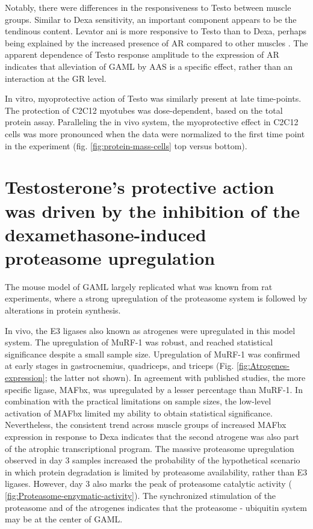 \documentclass[12pt,english]{report}\usepackage[]{graphicx}\usepackage[]{color}
\begin{document}
Notably, there were differences in the responsiveness to Testo between
muscle groups. Similar to Dexa sensitivity, an important component
appears to be the tendinous content. Levator ani is more responsive
to Testo than to Dexa, perhaps being explained by the increased presence
of AR compared to other muscles \citep{bentvelsen1996regulation}.
The apparent dependence of Testo response amplitude to the expression
of AR indicates that alleviation of GAML by AAS is a specific effect,
rather than an interaction at the GR level.

In vitro, myoprotective action of Testo was similarly present at late
time-points. The protection of C2C12 myotubes was dose-dependent,
based on the total protein assay. Paralleling the in vivo system,
the myoprotective effect in C2C12 cells was more pronounced when the
data were normalized to the first time point in the experiment (fig.
\ref{fig:protein-mass-cells} top versus bottom).


\section{Testosterone’s protective action was driven by the inhibition of
the dexamethasone-induced proteasome upregulation}

The mouse model of GAML largely replicated what was known from rat
experiments, where a strong upregulation of the proteasome system
is followed by alterations in protein synthesis.

In vivo, the E3 ligases also known as atrogenes were upregulated in
this model system. The upregulation of MuRF-1 was robust, and reached
statistical significance despite a small sample size. Upregulation
of MuRF-1 was confirmed at early stages in gastrocnemius, quadriceps,
and triceps (Fig. \ref{fig:Atrogenes-expression}; the latter not
shown). In agreement with published studies, the more specific ligase,
MAFbx, was upregulated by a lesser percentage than MuRF-1. In combination
with the practical limitations on sample sizes, the low-level activation
of MAFbx limited my ability to obtain statistical significance. Nevertheless,
the consistent trend across muscle groups of increased MAFbx expression
in response to Dexa indicates that the second atrogene was also part
of the atrophic transcriptional program. The massive proteasome upregulation
observed in day 3 samples increased the probability of the hypothetical
scenario in which protein degradation is limited by proteasome availability,
rather than E3 ligases. However, day 3 also marks the peak of proteasome
catalytic activity ( \ref{fig:Proteasome-enzymatic-activity}). The
synchronized stimulation of the proteasome and of the atrogenes indicates
that the proteasome - ubiquitin system may be at the center of GAML.
\end{document}
